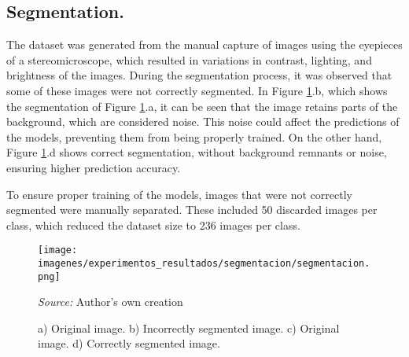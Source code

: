 \subsection{Segmentation.}

The dataset was generated from the manual capture of images using the eyepieces of a stereomicroscope, which resulted in variations in contrast, lighting, and brightness of the images. During the segmentation process, it was observed that some of these images were not correctly segmented. In Figure \ref{fig:segmentacioncorrecta}.b, which shows the segmentation of Figure \ref{fig:segmentacioncorrecta}.a, it can be seen that the image retains parts of the background, which are considered noise. This noise could affect the predictions of the models, preventing them from being properly trained. On the other hand, Figure \ref{fig:segmentacioncorrecta}.d shows correct segmentation, without background remnants or noise, ensuring higher prediction accuracy.

To ensure proper training of the models, images that were not correctly segmented were manually separated. These included 50 discarded images per class, which reduced the dataset size to 236 images per class.
\begin{figure}[htbp]
    \centering
    \texttt{[image: imagenes/experimentos\_resultados/segmentacion/segmentacion.png]}
    \caption{a) Original image. b) Incorrectly segmented image. c) Original image. d) Correctly segmented image.}
    \scriptsize \textit{Source:} Author's own creation
    \label{fig:segmentacioncorrecta}
\end{figure}